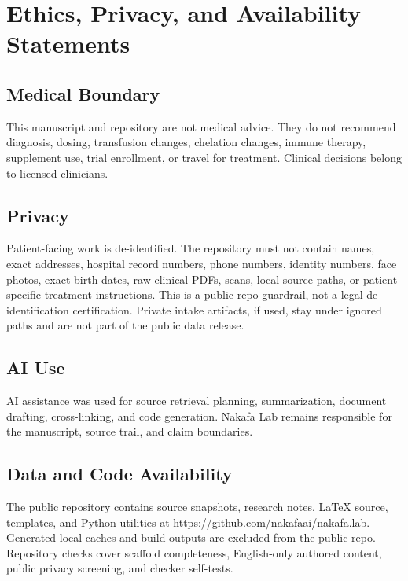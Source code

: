 \section{Ethics, Privacy, and Availability Statements}

\subsection{Medical Boundary}

This manuscript and repository are not medical advice. They do not recommend
diagnosis, dosing, transfusion changes, chelation changes, immune therapy,
supplement use, trial enrollment, or travel for treatment. Clinical decisions
belong to licensed clinicians.

\subsection{Privacy}

Patient-facing work is de-identified. The repository must not contain names,
exact addresses, hospital record numbers, phone numbers, identity numbers, face
photos, exact birth dates, raw clinical PDFs, scans, local source paths, or
patient-specific treatment instructions. This is a public-repo guardrail, not a
legal de-identification certification. Private intake artifacts, if used, stay
under ignored  paths and are not part of the public data
release.

\subsection{AI Use}

AI assistance was used for source retrieval planning, summarization, document
drafting, cross-linking, and code generation. Nakafa Lab remains responsible for
the manuscript, source trail, and claim boundaries.

\subsection{Data and Code Availability}

The public repository contains source snapshots, research notes, LaTeX source,
templates, and Python utilities at \url{https://github.com/nakafaai/nakafa.lab}.
Generated local caches and build outputs are excluded from the public repo.
Repository checks cover scaffold completeness, English-only authored content,
public privacy screening, and checker self-tests.

